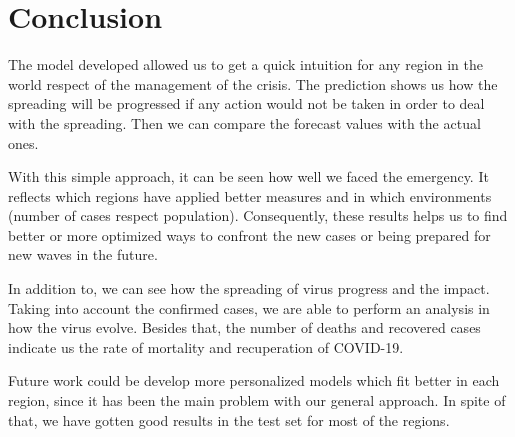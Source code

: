 \documentclass[lang=english,inputenc=utf8,fontsize=10pt]{ldvarticle}
\begin{document}
\section{Conclusion}
The model developed allowed us to get a quick intuition for any region in the world respect of the management of the crisis. The prediction shows us how the spreading will be progressed if any action would not be taken in order to deal with the spreading. Then we can compare the forecast values with the actual ones.

With this simple approach, it can be seen how well we faced the emergency. It reflects which regions have applied better measures and in which environments (number of cases respect population). Consequently, these results helps us to find better or more optimized ways to confront the new cases or being prepared for new waves in the future.

In addition to, we can see how the spreading of virus progress and the impact. Taking into account the confirmed cases, we are able to perform an analysis in how the virus evolve. Besides that, the number of deaths and recovered cases indicate us the rate of mortality and recuperation of COVID-19.

Future work could be develop more personalized models which fit better in each region, since it has been the main problem with our general approach. In spite of that, we have gotten good results in the test set for most of the regions.



\newpage


\end{document}
